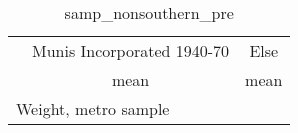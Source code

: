 \begin{table}[htbp]\centering
\def\sym#1{\ifmmode^{#1}\else\(^{#1}\)\fi}
\caption{samp\_nonsouthern\_pre \label{tab1}}
\begin{tabular}{l*{2}{c}}
\toprule
                    &\multicolumn{1}{c}{Munis Incorporated 1940-70}&\multicolumn{1}{c}{Else}\\
                    &        mean&        mean\\
\midrule
\bottomrule
\multicolumn{3}{l}{\footnotesize Weight, metro sample}\\
\end{tabular}
\end{table}

